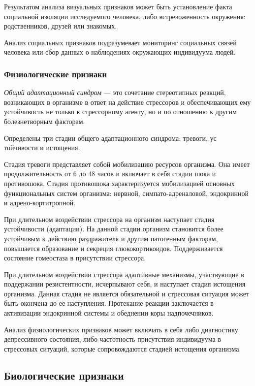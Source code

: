 Результатом анализа визуальных признаков может быть установление факта социальной изоляции исследуемого человека, либо встревоженность окружения: родственников, друзей или знакомых.

Анализ социальных признаков подразумевает мониторинг социальных связей человека или сбор данных о наблюдениях окружающих индивидуума людей.

\subsubsection{Физиологические признаки}

\textit{Общий адаптационный синдром} --- это сочетание стереотипных реакций, возникающих в организме в ответ на действие стрессоров и обеспечивающих ему устойчивость не только к стрессорному агенту, но и по отношению к другим болезнетворным факторам. \cite{stressAndPatology}

Определены три стадии общего адаптационного синдрома: тревоги, ус\- тойчивости и истощения.

Стадия тревоги представляет собой мобилизацию ресурсов организма. Она имеет продолжительность от 6 до 48 часов и включает в себя стадии шока и противошока. Стадия противошока характеризуется мобилизацией основных функциональных систем организма: нервной, симпато-адреналовой, эндокринной и адрено-кортитропной. \cite{stressAndPatology}

При длительном воздействии стрессора на организм наступает стадия ус\-тойчивости (адаптации). На данной стадии организм становится более устойчивым к действию раздражителя и другим патогенным факторам, повышается образование и секреция глюкокортикоидов. Поддерживается состояние гомеостаза в присутствии стрессора. \cite{stressAndPatology}

При длительном воздействии стрессора адаптивные механизмы, участвующие в поддержании резистентности, исчерпывают себя, и наступает стадия истощения организма. Данная стадия не является обязательной и стрессовая ситуация может быть окончена до ее наступления. Протекание реакции заключается в активизации эндокринной системы и обеднении коры надпочечников. \cite{stressAndPatology}

Анализ физиологических признаков может включать в себя либо диагностику депрессивного состояния, либо частотность присутствия индивидуума в стрессовых ситуаций, которые сопровождаются стадией истощения организма.

\subsection{Биологические признаки}

